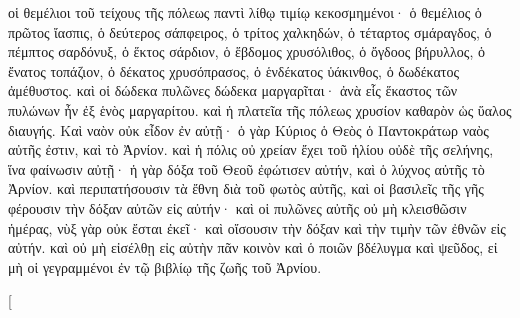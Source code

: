 \begin{pages}
\begin{Rightside}
		\pend
		\pstart
		οἱ θεμέλιοι τοῦ τείχους τῆς πόλεως παντὶ λίθῳ τιμίῳ κεκοσμημένοι· ὁ θεμέλιος ὁ πρῶτος ἴασπις, ὁ δεύτερος σάπφειρος, ὁ τρίτος χαλκηδών, ὁ τέταρτος σμάραγδος, ὁ πέμπτος σαρδόνυξ, ὁ ἕκτος σάρδιον, ὁ ἕβδομος χρυσόλιθος, ὁ ὄγδοος βήρυλλος, ὁ ἔνατος τοπάζιον, ὁ δέκατος χρυσόπρασος, ὁ ἑνδέκατος ὑάκινθος, ὁ δωδέκατος ἀμέθυστος. καὶ οἱ δώδεκα πυλῶνες δώδεκα μαργαρῖται· ἀνὰ εἷς ἕκαστος τῶν πυλώνων ἦν ἐξ ἑνὸς μαργαρίτου. καὶ ἡ πλατεῖα τῆς πόλεως χρυσίον καθαρὸν ὡς ὕαλος διαυγής. 
		\pend
		\pstart
		Καὶ ναὸν οὐκ εἶδον ἐν αὐτῇ· ὁ γὰρ Κύριος ὁ Θεὸς ὁ Παντοκράτωρ ναὸς αὐτῆς ἐστιν, καὶ τὸ Ἀρνίον. καὶ ἡ πόλις οὐ χρείαν ἔχει τοῦ ἡλίου οὐδὲ τῆς σελήνης, ἵνα φαίνωσιν αὐτῇ· ἡ γὰρ δόξα τοῦ Θεοῦ ἐφώτισεν αὐτήν, καὶ ὁ λύχνος αὐτῆς τὸ Ἀρνίον. καὶ περιπατήσουσιν τὰ ἔθνη διὰ τοῦ φωτὸς αὐτῆς, καὶ οἱ βασιλεῖς τῆς γῆς φέρουσιν τὴν δόξαν αὐτῶν εἰς αὐτήν· καὶ οἱ πυλῶνες αὐτῆς οὐ μὴ κλεισθῶσιν ἡμέρας, νὺξ γὰρ οὐκ ἔσται ἐκεῖ· καὶ οἴσουσιν τὴν δόξαν καὶ τὴν τιμὴν τῶν ἐθνῶν εἰς αὐτήν. καὶ οὐ μὴ εἰσέλθῃ εἰς αὐτὴν πᾶν κοινὸν καὶ ὁ ποιῶν βδέλυγμα καὶ ψεῦδος, εἰ μὴ οἱ γεγραμμένοι ἐν τῷ βιβλίῳ τῆς ζωῆς τοῦ Ἀρνίου.	
		\pend
        \endnumbering
    \end{Rightside}
    \begin{Leftside}
        \beginnumbering
        \pstart[

\end{Leftside}
\end{pages}
